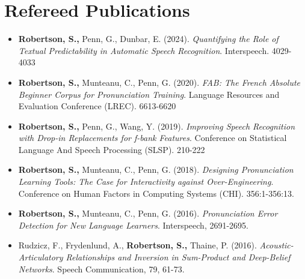 \documentclass[11pt,a4paper,sans]{moderncv}        %
\begin{document}
\section{Refereed Publications}
\begin{itemize}
  \item \textbf{Robertson, S.,} Penn, G., Dunbar, E. (2024).
    \textit{Quantifying the Role of Textual Predictability in Automatic Speech
    Recognition}. Interspeech. 4029-4033

  \item \textbf{Robertson, S.,} Munteanu, C., Penn, G. (2020).
    \textit{FAB: The French Absolute Beginner Corpus for Pronunciation
    Training}. Language Resources and Evaluation Conference (LREC). 6613-6620

  \item \textbf{Robertson, S.,} Penn, G., Wang, Y. (2019).
    \textit{Improving Speech Recognition with Drop-in Replacements for f-bank
    Features}. Conference on Statistical Language And Speech Processing
    (SLSP). 210-222

  \item \textbf{Robertson, S.,} Munteanu, C., Penn, G. (2018).
    \textit{Designing Pronunciation Learning Tools: The Case for Interactivity
    against Over-Engineering}. Conference on Human Factors in Computing Systems
    (CHI). 356:1-356:13.

  \item \textbf{Robertson, S.,} Munteanu, C., Penn, G. (2016).
    \textit{Pronunciation Error Detection for New Language Learners}.
    Interspeech, 2691-2695.

  \item Rudzicz, F., Frydenlund, A., \textbf{Robertson, S.,} Thaine, P. (2016).
    \textit{Acoustic-Articulatory Relationships and Inversion in Sum-Product
    and Deep-Belief Networks}. Speech Communication, 79, 61-73.
\end{itemize}
\end{document}
